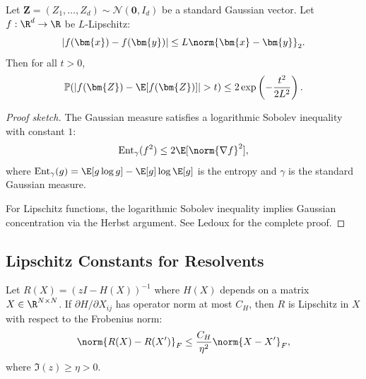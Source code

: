 \begin{theorem}\label{thm:gaussian-concentration}
Let $\bm{Z} = (Z_1, \ldots, Z_d) \sim \mathcal{N}(\bm{0}, I_d)$ be a standard Gaussian vector. Let $f: \R^d \to \R$ be $L$-Lipschitz:
\[
|f(\bm{x}) - f(\bm{y})| \leq L \norm{\bm{x} - \bm{y}}_2.
\]
Then for all $t > 0$,
\begin{equation}\label{eq:gaussian-concentration}
\mathbb{P}(|f(\bm{Z}) - \E[f(\bm{Z})]| > t) \leq 2 \exp\left(-\frac{t^2}{2L^2}\right).
\end{equation}
\end{theorem}

\begin{proof}[Proof sketch]
The Gaussian measure satisfies a logarithmic Sobolev inequality with constant $1$:
\[
\text{Ent}_\gamma(f^2) \leq 2\E[\norm{\nabla f}^2],
\]
where $\text{Ent}_\gamma(g) = \E[g \log g] - \E[g] \log \E[g]$ is the entropy and $\gamma$ is the standard Gaussian measure.

For Lipschitz functions, the logarithmic Sobolev inequality implies Gaussian concentration via the Herbst argument. See Ledoux \cite{ledoux2001concentration} for the complete proof.
\end{proof}

\subsection{Lipschitz Constants for Resolvents}

\begin{lemma}\label{lem:resolvent-lipschitz}
Let $R(X) = (zI - H(X))^{-1}$ where $H(X)$ depends on a matrix $X \in \R^{N \times N}$. If $\partial H/\partial X_{ij}$ has operator norm at most $C_H$, then $R$ is Lipschitz in $X$ with respect to the Frobenius norm:
\begin{equation}\label{eq:resolvent-lipschitz}
\norm{R(X) - R(X')}_F \leq \frac{C_H}{\eta^2} \norm{X - X'}_F,
\end{equation}
where $\Im(z) \geq \eta > 0$.
\end{lemma}


